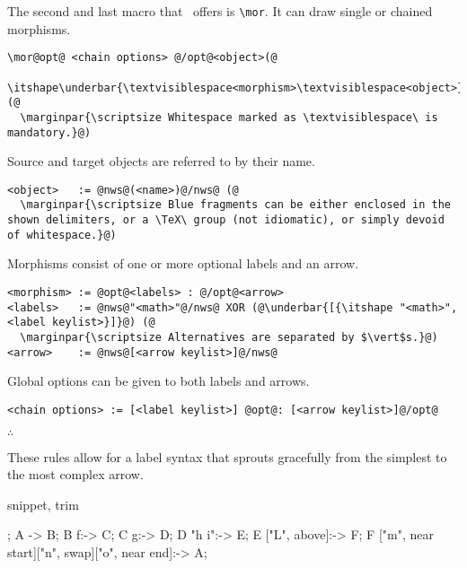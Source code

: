 \begingroup{}

The second and last macro that \koDi\ offers is \lstinline|\mor|.
It can draw single or chained morphisms.

\begin{lstlisting}
\mor@opt@ <chain options> @/opt@<object>(@
  \itshape\underbar{\textvisiblespace<morphism>\textvisiblespace<object>}@);(@
  \marginpar{\scriptsize Whitespace marked as \textvisiblespace\ is mandatory.}@)
\end{lstlisting}

Source and target objects are referred to by their name.
  
\begin{lstlisting}
<object>   := @nws@(<name>)@/nws@ (@
  \marginpar{\scriptsize Blue fragments can be either enclosed in the shown delimiters, or a \TeX\ group (not idiomatic), or simply devoid of whitespace.}@)
\end{lstlisting}

Morphisms consist of one or more optional labels and an arrow.
  
\begin{lstlisting}
<morphism> := @opt@<labels> : @/opt@<arrow>
<labels>   := @nws@"<math>"@/nws@ XOR (@\underbar{[{\itshape "<math>", <label keylist>}]}@) (@
  \marginpar{\scriptsize Alternatives are separated by $\vert$s.}@)
<arrow>    := @nws@[<arrow keylist>]@/nws@
\end{lstlisting}

Global options can be given to both labels and arrows.

\begin{lstlisting}
<chain options> := [<label keylist>] @opt@: [<arrow keylist>]@/opt@
\end{lstlisting}

\hfill$\therefore$\hfill\null

These rules allow for a label syntax that sprouts gracefully
from the simplest to the most complex arrow.

\begin{tcblisting}{snippet, trim}
\begin{kodi}
;
\mor A -> B;
\mor B f:-> C;
\mor C \hat g:-> D;
\mor D "h i":-> E;
\mor E ["L", above]:-> F;
\mor F ["m", near start]["n", swap]["o", near end]:-> A;
\end{kodi}
\end{tcblisting}

